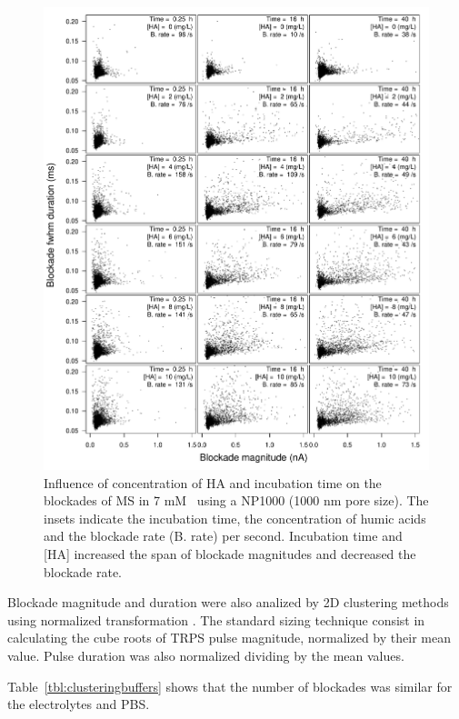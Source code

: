 \documentclass[journal=langd5,manuscript=article]{achemso}
\begin{document}


 \begin{figure}
  \includegraphics[width=\linewidth]{Figures/Scattering_MS_HA_D2_detail.pdf}
  \caption{Influence of concentration of HA and incubation time on the blockades of MS in 7 mM~ using a NP1000 (1000 nm pore size). The insets indicate the incubation time, the concentration of humic acids and the blockade rate (B. rate) per second. Incubation time and [HA] increased the span of blockade magnitudes and decreased the blockade rate.}
\label{fgr:blockades}
\end{figure}





Blockade magnitude and duration were also analized  by 2D clustering methods using  normalized transformation 
\cite{Weatherall2016,VogelQuantitativeSizing2011}.
The  standard sizing technique consist in calculating the cube roots of TRPS pulse magnitude, normalized by their mean value. Pulse duration was also normalized  dividing by the mean values.


Table~\ref{tbl:clusteringbuffers} shows that the number of blockades was similar for the electrolytes and PBS.
\end{document}
